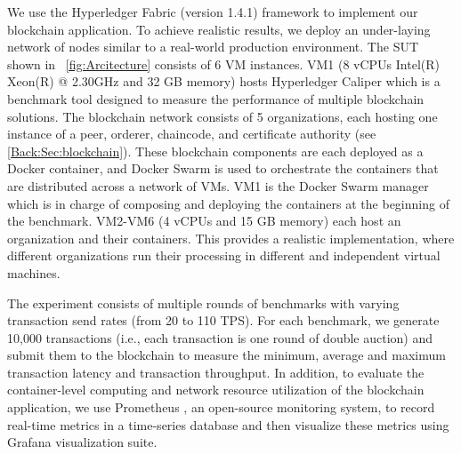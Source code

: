 We use the Hyperledger Fabric (version 1.4.1) framework to implement our blockchain application. To achieve realistic results, we deploy an under-laying network of nodes similar to a real-world production environment. The \ac{SUT} shown in \figureautorefname~\ref{fig:Arcitecture} consists of 6 \ac{VM} instances. \ac{VM}1 (8 \acp{vCPU} Intel(R) Xeon(R) @ 2.30GHz and 32 GB memory) hosts Hyperledger Caliper \cite{caliper} which is a benchmark tool designed to measure the performance of multiple blockchain solutions. The blockchain network consists of 5 organizations, each hosting one instance of a peer, orderer, chaincode, and certificate authority (see \autoref{Back:Sec:blockchain}). These blockchain components are each deployed as a Docker container, and Docker Swarm is used to orchestrate the containers that are distributed across a network of \acp{VM}. \ac{VM}1 is the Docker Swarm manager which is in charge of composing and deploying the containers at the beginning of the benchmark. \ac{VM}2-\ac{VM}6 (4 \acp{vCPU} and 15 GB memory) each host an organization and their containers. This provides a realistic implementation, where different organizations run their processing in different and independent virtual machines. %



The experiment consists of multiple rounds of benchmarks with varying transaction send rates (from 20 to 110 \ac{TPS}). For each benchmark, we generate 10,000 transactions (i.e., each transaction is one round of double auction) and submit them to the blockchain to measure the minimum, average and maximum transaction latency and transaction throughput. In addition, to evaluate the container-level computing and network resource utilization of the blockchain application, we use Prometheus \cite{prometheus}, an open-source monitoring system, to record real-time metrics in a time-series database and then visualize these metrics using Grafana \cite{grafana} visualization suite.


